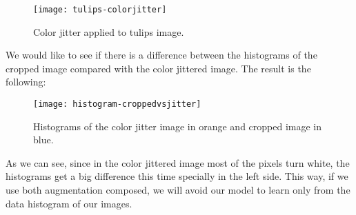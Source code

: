 \begin{figure}[H] 
    \centering
    \texttt{[image: tulips-colorjitter]}%
        \label{fig:color:jitter}%
        \caption{Color jitter applied to tulips image.}
\end{figure}

We would like to see if there is a difference between the histograms of the cropped image compared with the color jittered image. The result is the following:

\begin{figure}[H] 
    \centering
    \texttt{[image: histogram-croppedvsjitter]}%
        \label{fig:color:jitter}%
        \caption{Histograms of the color jitter image in orange and cropped image in blue.}
\end{figure}

As we can see, since in the color jittered image most of the pixels turn white, the histograms get a big difference this time specially in the left side. This way, if we use both augmentation composed, we will avoid our model to learn only from the data histogram of our images.

